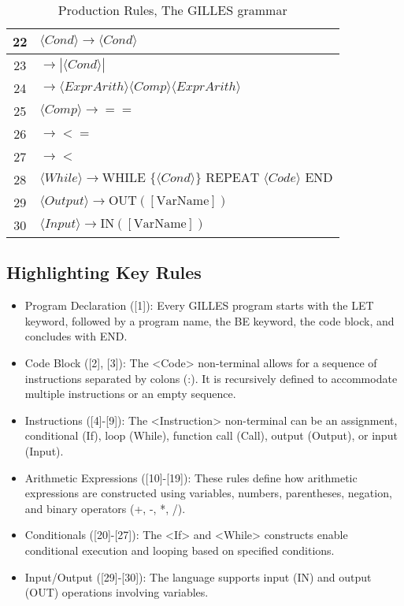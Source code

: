 \begin{table}[h!]
\begin{tabular}{|c|l|}
22 & $\langle Cond \rangle \rightarrow \langle Cond \rangle$ \\ \hline
23 & $\rightarrow | \langle Cond \rangle |$ \\ \hline
24 & $\rightarrow \langle ExprArith \rangle \langle Comp \rangle \langle ExprArith \rangle$ \\ \hline
25 & $\langle Comp \rangle \rightarrow ==$ \\ \hline
26 & $\rightarrow <=$ \\ \hline
27 & $\rightarrow <$ \\ \hline
28 & $\langle While \rangle \rightarrow \text{WHILE } \{ \langle Cond \rangle \} \text{ REPEAT } \langle Code \rangle \text{ END}$ \\ \hline
29 & $\langle Output \rangle \rightarrow \text{OUT}([\text{VarName}])$ \\ \hline
30 & $\langle Input \rangle \rightarrow \text{IN}([\text{VarName}])$ \\ \hline
\end{tabular}
\caption{Production Rules, The GILLES grammar}
\end{table}
\subsection{Highlighting Key Rules}

	\begin{itemize}
	\item Program Declaration ([1]): Every GILLES program starts with the LET keyword, followed by a program name, the BE keyword, the code block, and concludes with END.
	\item Code Block ([2], [3]): The <Code> non-terminal allows for a sequence of instructions separated by colons (:). It is recursively defined to accommodate multiple instructions or an empty sequence.
	\item Instructions ([4]-[9]): The <Instruction> non-terminal can be an assignment, conditional (If), loop (While), function call (Call), output (Output), or input (Input).
	\item Arithmetic Expressions ([10]-[19]): These rules define how arithmetic expressions are constructed using variables, numbers, parentheses, negation, and binary operators (+, -, *, /).
	\item Conditionals ([20]-[27]): The <If> and <While> constructs enable conditional execution and looping based on specified conditions.
	\item Input/Output ([29]-[30]): The language supports input (IN) and output (OUT) operations involving variables.
	\end{itemize}

